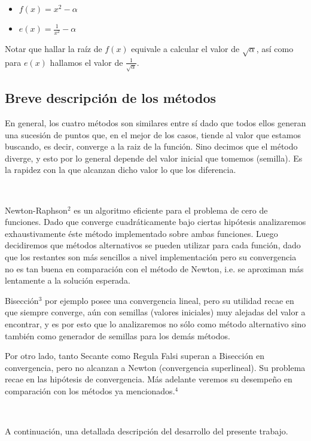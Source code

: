 \begin{itemize}
	\item $f(x) = x^2 - \alpha$
	\item $\displaystyle e(x) = \frac{1}{x^2} - \alpha$
\end{itemize}

Notar que hallar la raíz de $f(x)$ equivale a calcular el valor de $\sqrt{\alpha}$, así como para $e(x)$ hallamos el valor de $\displaystyle 
\frac{1}{\sqrt{\alpha}}$.

\subsection{Breve descripción de los métodos}

En general, los cuatro métodos son similares entre sí dado que todos ellos generan una sucesión de puntos que, en el mejor de los casos, tiende al valor que estamos buscando, es decir, converge a la raiz de la función. Sino decimos que el método diverge, y esto por lo general depende del valor inicial que tomemos (semilla). Es la rapidez con la que alcanzan dicho valor lo que los diferencia.



~

Newton-Raphson$^2$ es un algoritmo eficiente para el problema de cero de funciones. Dado que converge cuadráticamente bajo ciertas hipótesis analizaremos exhaustivamente éste método implementado sobre ambas funciones. Luego decidiremos que métodos alternativos se pueden utilizar para cada función, dado que los restantes son más sencillos a nivel implementación pero su convergencia no es tan buena en comparación con el método de Newton, i.e. se aproximan más lentamente a la solución esperada.

Bisección$^3$ por ejemplo posee una convergencia lineal, pero su utilidad recae en que siempre converge, aún con semillas (valores iniciales) muy alejadas del valor a encontrar, y es por esto que lo analizaremos no sólo como método alternativo sino también como generador de semillas para los demás métodos.

Por otro lado, tanto Secante como Regula Falsi superan a Bisección en convergencia, pero no alcanzan a Newton (convergencia superlineal). Su problema recae en las hipótesis de convergencia. Más adelante veremos su desempeño en comparación con los métodos ya mencionados.$^4$ 

~

A continuación, una detallada descripción del desarrollo del presente trabajo.
